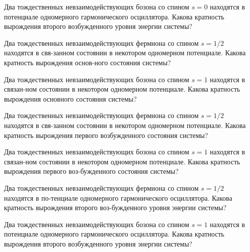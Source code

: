 \documentclass[11pt,a4paper]{exam}
\begin{document}
\begin{questions}
\question Два тождественных невзаимодействующих бозона со спином $s = 0$ находятся в потенциале одномерного гармонического осциллятора. Какова кратность вырождения второго возбужденного уровня энергии системы? 
\begin{choices}
\end{choices}

\question Два тождественных невзаимодействующих фермиона со спином $s = 1/2$ находятся в свя-занном состоянии в некотором одномерном потенциале. Какова кратность вырождения основ-ного состояния системы? 
\begin{choices}
\end{choices}

\question Два тождественных невзаимодействующих бозона со спином $s = 1$ находятся в связан-ном состоянии в некотором одномерном потенциале. Какова кратность вырождения основного состояния системы? 
\begin{choices}
\end{choices}

\question Два тождественных невзаимодействующих фермиона со спином $s = 1/2$ находятся в свя-занном состоянии в некотором одномерном потенциале. Какова кратность вырождения первого возбужденного состояния системы? 
\begin{choices}
\end{choices}

\question Два тождественных невзаимодействующих бозона со спином $s = 1$ находятся в связан-ном состоянии в некотором одномерном потенциале. Какова кратность вырождения первого воз-бужденного состояния системы? 
\begin{choices}
\end{choices}

\question Два тождественных невзаимодействующих фермиона со спином $s = 1/2$ находятся в по-тенциале одномерного гармонического осциллятора. Какова кратность вырождения второго воз-бужденного уровня энергии системы? 
\begin{choices}
\end{choices}

\question Два тождественных невзаимодействующих бозона со спином $s = 1$ находятся в потенциале одномерного гармонического осциллятора. Какова кратность вырождения второго возбужденного уровня энергии системы? 
\begin{choices}
\end{choices}


\end{questions}
\end{document}
